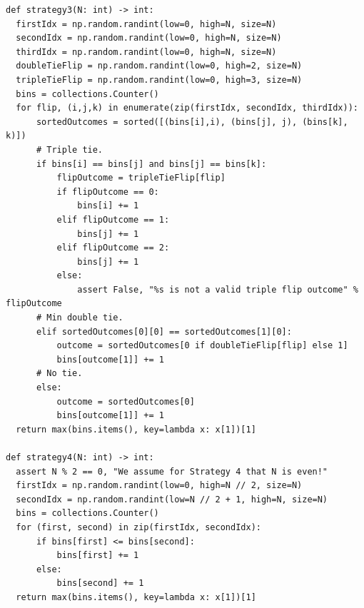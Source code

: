 \documentclass[12pt]{article}
\begin{document}
\begin{enumerate}[label=(\alph*)]
\begin{verbatim}
def strategy3(N: int) -> int:
  firstIdx = np.random.randint(low=0, high=N, size=N)
  secondIdx = np.random.randint(low=0, high=N, size=N)
  thirdIdx = np.random.randint(low=0, high=N, size=N)
  doubleTieFlip = np.random.randint(low=0, high=2, size=N)
  tripleTieFlip = np.random.randint(low=0, high=3, size=N)
  bins = collections.Counter()
  for flip, (i,j,k) in enumerate(zip(firstIdx, secondIdx, thirdIdx)):
      sortedOutcomes = sorted([(bins[i],i), (bins[j], j), (bins[k], k)])
      # Triple tie.
      if bins[i] == bins[j] and bins[j] == bins[k]:
          flipOutcome = tripleTieFlip[flip]
          if flipOutcome == 0:
              bins[i] += 1
          elif flipOutcome == 1:
              bins[j] += 1
          elif flipOutcome == 2:
              bins[j] += 1
          else:
              assert False, "%s is not a valid triple flip outcome" % flipOutcome
      # Min double tie.
      elif sortedOutcomes[0][0] == sortedOutcomes[1][0]:
          outcome = sortedOutcomes[0 if doubleTieFlip[flip] else 1]
          bins[outcome[1]] += 1
      # No tie.
      else:
          outcome = sortedOutcomes[0]
          bins[outcome[1]] += 1
  return max(bins.items(), key=lambda x: x[1])[1]

def strategy4(N: int) -> int:
  assert N % 2 == 0, "We assume for Strategy 4 that N is even!"
  firstIdx = np.random.randint(low=0, high=N // 2, size=N)
  secondIdx = np.random.randint(low=N // 2 + 1, high=N, size=N)
  bins = collections.Counter()
  for (first, second) in zip(firstIdx, secondIdx):
      if bins[first] <= bins[second]:
          bins[first] += 1
      else:
          bins[second] += 1
  return max(bins.items(), key=lambda x: x[1])[1]
    \end{verbatim}


\end{enumerate}
\end{document}
